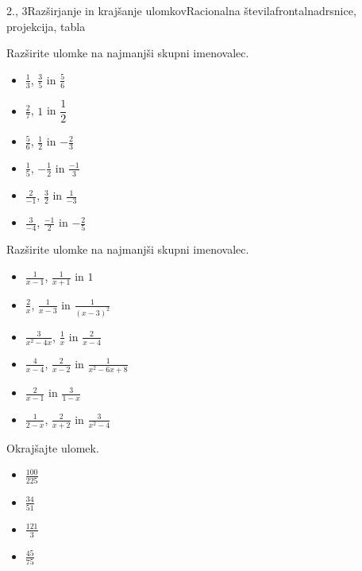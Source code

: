 \begin{priprava}{2., 3}{}{Razširjanje in krajšanje ulomkov}{Racionalna števila}{frontalna}{drsnice, projekcija, tabla}
        
            \begin{naloga}
                Razširite ulomke na najmanjši skupni imenovalec.
                \begin{itemize}
                            \item $\frac{1}{3}$, $\frac{3}{5}$ in $\frac{5}{6}$ 
                            \item $\frac{2}{7}$, $1$ in $\dfrac{1}{2}$ 
                            \item $\frac{5}{6}$, $\frac{1}{2}$ in $-\frac{2}{3}$ 
                            \item $\frac{1}{5}$, $-\frac{1}{2}$ in $\frac{-1}{3}$ 
                            \item $\frac{2}{-1}$, $\frac{3}{2}$ in $\frac{1}{-3}$ 
                            \item $\frac{3}{-4}$, $\frac{-1}{2}$ in $-\frac{2}{5}$ 
                \end{itemize}
            \end{naloga}
        

        
            \begin{naloga}
                Razširite ulomke na najmanjši skupni imenovalec.
                \begin{itemize}
                            \item $\frac{1}{x-1}$, $\frac{1}{x+1}$ in $1$ 
                            \item $\frac{2}{x}$, $\frac{1}{x-3}$ in $\frac{1}{(x-3)^2}$ 
                            \item $\frac{3}{x^2-4x}$, $\frac{1}{x}$ in $\frac{2}{x-4}$ 
                            \item $\frac{4}{x-4}$, $\frac{2}{x-2}$ in $\frac{1}{x^2-6x+8}$ 
                            \item $\frac{2}{x-1}$ in $\frac{3}{1-x}$ 
                            \item $\frac{1}{2-x}$, $\frac{2}{x+2}$ in $\frac{3}{x^2-4}$ 
                \end{itemize}
            \end{naloga}
        

        
            \begin{naloga}
                Okrajšajte ulomek.
                \begin{itemize}
                    \item $\frac{100}{225}$ 
                    \item $\frac{34}{51}$ 
                    \item $\frac{121}{3}$ 
                    \item $\frac{45}{75}$ 
                \end{itemize}
            \end{naloga}
        


\end{priprava}
